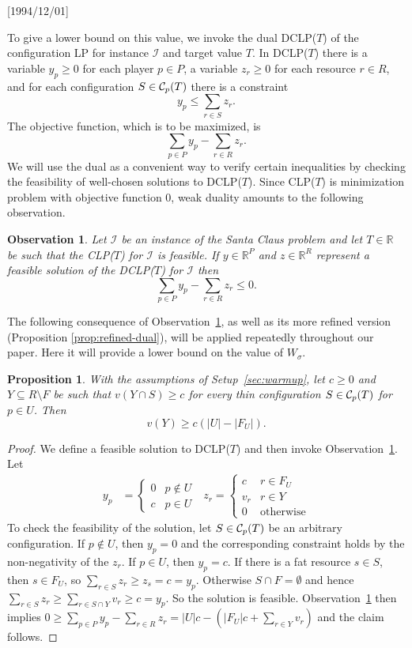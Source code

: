 \NeedsTeXFormat{LaTeX2e}[1994/12/01]\documentclass[letterpaper, 11pt]{article}
\newtheorem{prop}[thm]{Proposition}
\newtheorem{obs}[thm]{Observation}
\theoremstyle{definition}
\theoremstyle{remark}
\numberwithin{equation}{section}
\newcommand{\cI}{\mathcal{I}}
\begin{document}
To give a lower bound on this value,   we invoke the dual DCLP($T$) of the
configuration LP for instance $\cI$ and target
value $T$. 
In DCLP($T$) there is a variable $y_p\geq 0$ for each player $p\in P$, a
variable $z_r\geq 0$ for each resource $r\in R$, and for each configuration
$S\in {\cal C}_p(T)$ there is a constraint $$y_p \leq \sum_{r \in S}
z_r.$$
The objective function, which is to be maximized, is  $$\sum_{p\in P}y_p -\sum_{r\in R}z_r.$$
We will use the dual as a convenient way to verify certain inequalities by checking the feasibility of well-chosen solutions to DCLP($T$).
Since CLP($T$) is minimization problem with objective function $0$,  weak duality amounts to the following observation. 
\begin{obs}\label{obs:weak-duality}  Let $\cI$ be an instance of the Santa Claus problem and let $T\in\mathbb{R}$ be such that the CLP($T$) for $\cI$ is feasible. If $y \in \mathbb{R}^P$ and $ z \in \mathbb{R}^R$ represent a feasible solution of the DCLP($T$) for $\cI$ then $$\sum_{p\in P}y_p - \sum_{r\in R}z_r \leq 0.$$
\end{obs}
 
The following consequence of Observation~\ref{obs:weak-duality}, as well as its more refined version (Proposition \ref{prop:refined-dual}), will be applied repeatedly throughout our paper. Here it will provide a lower bound on the value of $W_{\sigma}$.

\begin{prop}\label{prop:dual} With the assumptions of
    Setup~\ref{sec:warmup}, let $c\geq 0$ and 
  $Y\subseteq R\setminus F$ be such that $v(Y\cap S) \geq 
  c$ for every thin configuration $S \in {\cal C}_p(T)$ for $p\in U$.
  Then 
$$v(Y) \geq c (|U|-|F_U|).$$
\end{prop}

\begin{proof} We define a feasible  solution to DCLP($T$) and then
  invoke Observation~\ref{obs:weak-duality}. Let 
\begin{align*} 
y_p & = \left\{ 
\begin{array}{cc} 
0 & p\not\in U \\
c & p\in U 
\end{array}
\right.
\ \ \ 
z_r = \left\{
\begin{array}{cc}
c & r\in F_U \\
v_r & r\in Y\\
0 & \mbox{otherwise}
\end{array}
\right.
\end{align*}
To check the feasibility of the solution, let 
$S\in {\cal C}_p(T)$ be an arbitrary configuration.
If $p\not\in U$, then $y_p=0$ and the corresponding constraint holds
by the non-negativity of the $z_r$. 
If $p\in U$, then $y_p =c$. If there is a fat resource $s\in S$, then
$s \in F_U$, so $\sum_{r\in S}z_r \geq
z_s = c =y_p$. Otherwise $S\cap F = \emptyset$ and hence $\sum_{r\in S}z_r \geq \sum_{r\in
   S\cap Y} v_r \geq c = y_p$. 
So the solution is feasible. Observation~\ref{obs:weak-duality} then implies $0\geq \sum_{p\in P}y_p -\sum_{r\in R}z_r = |U|c
- (|F_U|c +\sum_{r\in Y}v_r )$ and the claim follows.
\end{proof}
\end{document}
